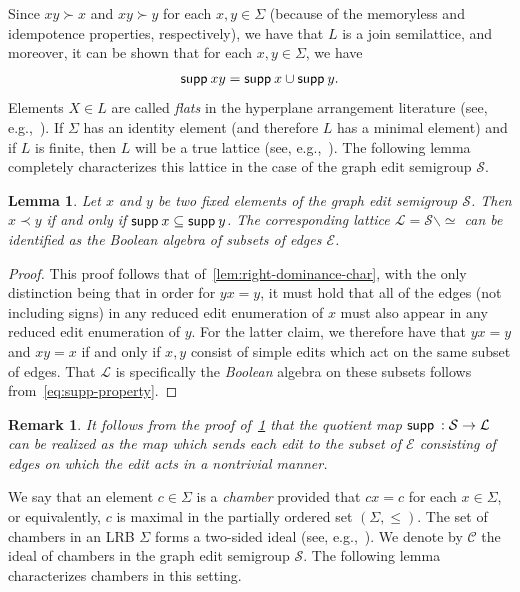 \documentclass[11pt,a4paper]{article}
\newcommand{\supp}{{\mathsf{supp }\hspace{.075cm}}}
\newtheorem{remark}[theorem]{Remark}
\newtheorem{lemma}[theorem]{Lemma}
\begin{document}
Since $xy \succ x$ and $xy \succ y$ for each $x, y\in \Sigma$ (because of the memoryless and idempotence properties, respectively), we have that $L$ is a join semilattice, and moreover, it can be shown that for each $x, y\in \Sigma$, we have
    \begin{align}\label{eq:supp-property}
        \supp{xy} = \supp{x} \cup \supp{y}.
    \end{align}
Elements $X\in L$ are called \textit{flats} in the hyperplane arrangement literature (see, e.g.,~\cite{brown1998random}). If $\Sigma$ has an identity element (and therefore $L$ has a minimal element) and if $L$ is finite, then $L$ will be a true lattice (see, e.g.,~\cite[Section 3.3]{stanley2011enumerative}). The following lemma completely characterizes this lattice in the case of the graph edit semigroup $\mathcal{S}$.

\begin{lemma}\label{lem:left-dominance-char}
    Let $x$ and $y$ be two fixed elements of the graph edit semigroup $\mathcal{S}$. Then $x\prec y$ if and only if $\supp{x}\subseteq\supp{y}$. The corresponding lattice $\mathcal{L} = \mathcal{S}\backslash \simeq$ can be identified as the Boolean algebra of subsets of edges ${\mathcal{E}}$.
\end{lemma}

\begin{proof}
    This proof follows that of~\cref{lem:right-dominance-char}, with the only distinction being that in order for $yx = y$, it must hold that all of the edges (not including signs) in any reduced edit enumeration of $x$ must also appear in any reduced edit enumeration of $y$. For the latter claim, we therefore have that $yx = y$ and $xy = x$ if and only if $x, y$ consist of simple edits which act on the same subset of edges. That $\mathcal{L}$ is specifically the \emph{Boolean} algebra on these subsets follows from~\cref{eq:supp-property}.
\end{proof}

\begin{remark}\label{rmk:quotient-map}
    It follows from the proof of~\cref{lem:left-dominance-char} that the quotient map $\supp:\mathcal{S}\rightarrow \mathcal{L}$ can be realized as the map which sends each edit to the subset of $\mathcal{E}$ consisting of edges on which the edit acts in a nontrivial manner.
\end{remark}

We say that an element $c\in \Sigma$ is a \textit{chamber} provided that $cx = c$ for each $x\in \Sigma$, or equivalently, $c$ is maximal in the partially ordered set $(\Sigma, \leqslant)$. The set of chambers in an LRB $\Sigma$ forms a two-sided ideal (see, e.g.,~\cite[Proposition 9]{brownSemigroupsRingsMarkov2000}). We denote by $\mathcal{C}$ the ideal of chambers in the graph edit semigroup $\mathcal{S}$. The following lemma characterizes chambers in this setting.
\end{document}
